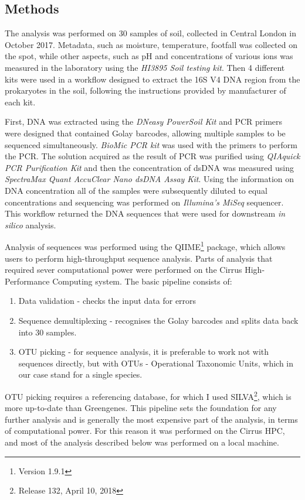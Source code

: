 \documentclass[12pt]{article}
\begin{document}
\begin{multicols}{2}
\section{Methods}
The analysis was performed on 30 samples of soil, collected in Central London in October 2017. Metadata, such as moisture, temperature, footfall was collected on the spot, while other aspects, such as pH and concentrations of various ions was measured in the laboratory using the \textit{HI3895 Soil testing kit}. Then 4 different kits were used in a workflow designed to extract the 16S V4 DNA region from the prokaryotes in the soil, following the instructions provided by manufacturer of each kit.
\par
First, DNA was extracted using the \textit{DNeasy PowerSoil Kit} and PCR primers were designed that contained Golay barcodes, allowing multiple samples to be sequenced simultaneously. \textit{BioMic PCR kit} was used with the primers to perform the PCR. The solution acquired as the result of PCR was purified using \textit{QIAquick PCR Purification Kit} and then the concentration of dsDNA was measured using \textit{SpectraMax Quant AccuClear Nano dsDNA Assay Kit}. Using the information on DNA concentration all of the samples were subsequently diluted to equal concentrations and sequencing was performed on \textit{Illumina's MiSeq} sequencer. This workflow returned the DNA sequences that were used for downstream \textit{in silico} analysis.
\par
Analysis of sequences was performed using the QIIME\footnote{Version 1.9.1} package\cite{Caporaso2010,Kuczynski2012}, which allows users to perform high-throughput sequence analysis. Parts of analysis that required sever computational power were performed on the Cirrus High-Performance Computing system. The basic pipeline consists of:
\begin{enumerate}
	\item Data validation - checks the input data for errors
	\item Sequence demultiplexing - recognises the Golay barcodes and splits data back into 30 samples.
	\item OTU picking - for sequence analysis, it is preferable to work not with sequences directly, but with OTUs - Operational Taxonomic Units, which in our case stand for a single species.
\end{enumerate}
\par 
OTU picking requires a referencing database, for which I used SILVA\cite{Quast2012}\footnote{Release 132, April 10, 2018}, which is more up-to-date than Greengenes\cite{McDonald2012}. This pipeline sets the foundation for any further analysis and is generally the most expensive part of the analysis, in terms of computational power. For this reason it was performed on the Cirrus HPC, and most of the analysis described below was performed on a local machine. 

\end{multicols}
\end{document}
